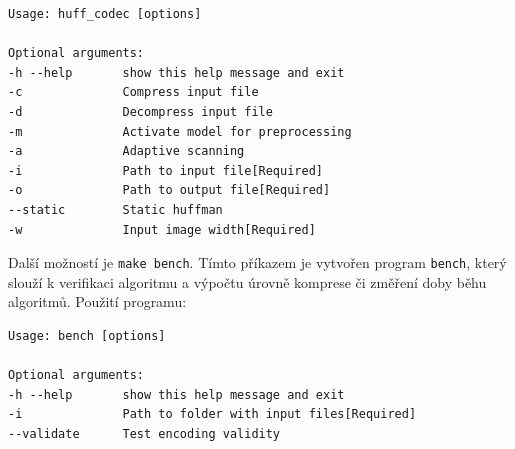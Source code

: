 \documentclass[12pt,a4paper,titlepage,final]{report}
\begin{document}
\begin{lstlisting}
Usage: huff_codec [options] 

Optional arguments:
-h --help       show this help message and exit
-c              Compress input file
-d              Decompress input file
-m              Activate model for preprocessing
-a              Adaptive scanning
-i              Path to input file[Required]
-o              Path to output file[Required]
--static        Static huffman
-w              Input image width[Required]

\end{lstlisting}

Další možností je \texttt{make bench}. Tímto příkazem je vytvořen program \texttt{bench}, který slouží k verifikaci algoritmu a výpočtu úrovně komprese či změření doby běhu algoritmů. Použití programu:

\begin{lstlisting}
Usage: bench [options] 

Optional arguments:
-h --help       show this help message and exit
-i              Path to folder with input files[Required]
--validate      Test encoding validity

\end{lstlisting}

\nocite{data_compr1}

\begin{flushleft}
  
\end{flushleft}
\end{document}
